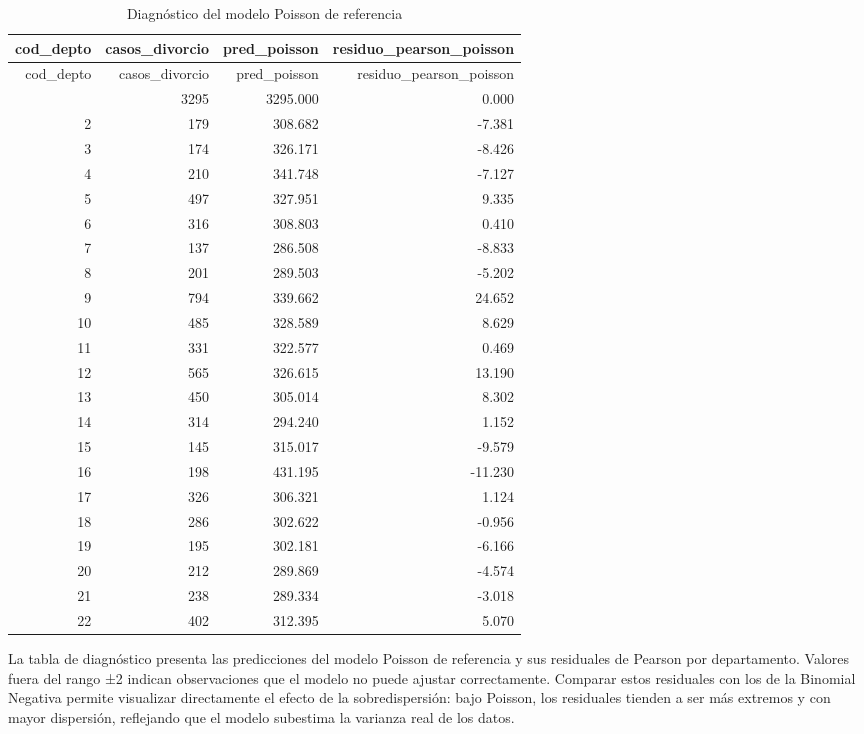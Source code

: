 \documentclass[
]{article}
\begin{document}
\begin{longtable}[]{@{}rrrr@{}}
\caption{Diagnóstico del modelo Poisson de referencia}\tabularnewline
\toprule\noalign{}
cod\_depto & casos\_divorcio & pred\_poisson &
residuo\_pearson\_poisson \\
\midrule\noalign{}
\endfirsthead
\toprule\noalign{}
cod\_depto & casos\_divorcio & pred\_poisson &
residuo\_pearson\_poisson \\
\midrule\noalign{}
\endhead
\bottomrule\noalign{}
\endlastfoot
1 & 3295 & 3295.000 & 0.000 \\
2 & 179 & 308.682 & -7.381 \\
3 & 174 & 326.171 & -8.426 \\
4 & 210 & 341.748 & -7.127 \\
5 & 497 & 327.951 & 9.335 \\
6 & 316 & 308.803 & 0.410 \\
7 & 137 & 286.508 & -8.833 \\
8 & 201 & 289.503 & -5.202 \\
9 & 794 & 339.662 & 24.652 \\
10 & 485 & 328.589 & 8.629 \\
11 & 331 & 322.577 & 0.469 \\
12 & 565 & 326.615 & 13.190 \\
13 & 450 & 305.014 & 8.302 \\
14 & 314 & 294.240 & 1.152 \\
15 & 145 & 315.017 & -9.579 \\
16 & 198 & 431.195 & -11.230 \\
17 & 326 & 306.321 & 1.124 \\
18 & 286 & 302.622 & -0.956 \\
19 & 195 & 302.181 & -6.166 \\
20 & 212 & 289.869 & -4.574 \\
21 & 238 & 289.334 & -3.018 \\
22 & 402 & 312.395 & 5.070 \\
\end{longtable}

La tabla de diagnóstico presenta las predicciones del modelo Poisson de
referencia y sus residuales de Pearson por departamento. Valores fuera
del rango ±2 indican observaciones que el modelo no puede ajustar
correctamente. Comparar estos residuales con los de la Binomial Negativa
permite visualizar directamente el efecto de la sobredispersión: bajo
Poisson, los residuales tienden a ser más extremos y con mayor
dispersión, reflejando que el modelo subestima la varianza real de los
datos.
\end{document}
